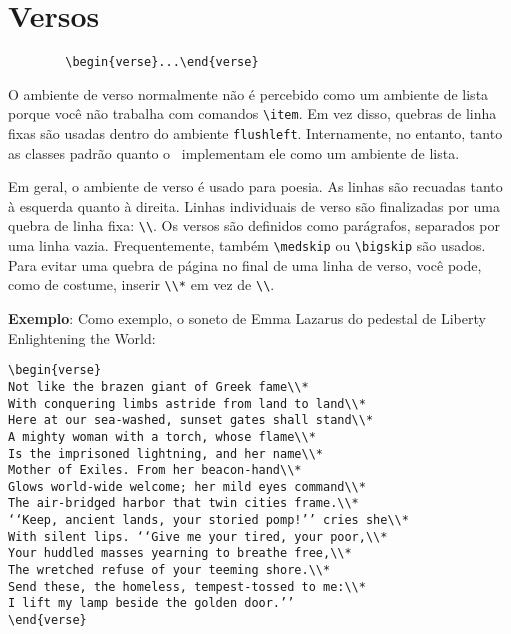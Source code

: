 \chapter{Versos}
\begin{verbatim}
        \begin{verse}...\end{verse}    
\end{verbatim}

O ambiente de verso normalmente não é percebido como um ambiente de lista porque você não trabalha com comandos \verb|\item|. Em vez disso, quebras de linha fixas são usadas dentro do ambiente \texttt{flushleft}. Internamente, no entanto, tanto as classes padrão quanto o \KOMAScript\ implementam ele como um ambiente de lista.

Em geral, o ambiente de verso é usado para poesia. As linhas são recuadas tanto à esquerda quanto à direita. Linhas individuais de verso são finalizadas por uma quebra de linha fixa: \verb|\\|. Os versos são definidos como parágrafos, separados por uma linha vazia. Frequentemente, também \verb|\medskip| ou \verb|\bigskip| são usados. Para evitar uma quebra de página no final de uma linha de verso, você pode, como de costume, inserir \verb|\\*| em vez de \verb|\\|.

\textbf{Exemplo}: Como exemplo, o soneto de Emma Lazarus do pedestal de Liberty Enlightening the World:
\begin{verbatim}
\begin{verse}
Not like the brazen giant of Greek fame\\*
With conquering limbs astride from land to land\\*
Here at our sea-washed, sunset gates shall stand\\*
A mighty woman with a torch, whose flame\\*
Is the imprisoned lightning, and her name\\*
Mother of Exiles. From her beacon-hand\\*
Glows world-wide welcome; her mild eyes command\\*
The air-bridged harbor that twin cities frame.\\*
‘‘Keep, ancient lands, your storied pomp!’’ cries she\\*
With silent lips. ‘‘Give me your tired, your poor,\\*
Your huddled masses yearning to breathe free,\\*
The wretched refuse of your teeming shore.\\*
Send these, the homeless, tempest-tossed to me:\\*
I lift my lamp beside the golden door.’’
\end{verse} 
\end{verbatim}

